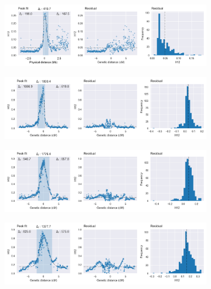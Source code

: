 \begin{refsection}
\begin{figure}[tp]
\begin{subfigure}[t]{0.32\textwidth}
    \end{subfigure}
    \begin{subfigure}[t]{0.32\textwidth}
        \centering
        \caption{}
        \includegraphics[width=1.1\textwidth,center,trim=0 0 380 0, clip]{artwork/chapter5/peak_fit_h12_cyp9k1_gns.png}
    \end{subfigure}
    \vspace{0cm}
    \begin{subfigure}[t]{0.32\textwidth}
        \centering
        \caption{}
        \includegraphics[width=1.1\textwidth,center,trim=0 0 380 0, clip]{artwork/chapter5/peak_fit_h12_vgsc_bfm.png}
    \end{subfigure}
    \hfill
    \begin{subfigure}[t]{0.32\textwidth}
        \centering
        \caption{}
        \includegraphics[width=1.1\textwidth,center,trim=0 0 380 0, clip]{artwork/chapter5/peak_fit_h12_vgsc_bfs.png}
    \end{subfigure}
    \begin{subfigure}[t]{0.32\textwidth}
        \centering
        \caption{}
        \includegraphics[width=1.1\textwidth,center,trim=0 0 380 0, clip]{artwork/chapter5/peak_fit_h12_vgsc_ugs.png}

\end{subfigure}
\end{figure}
\end{refsection}
